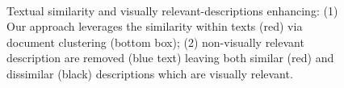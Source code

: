 \documentclass[11pt,a4paper]{article}
\newcommand\gal[1]{\textcolor{bright}{\textbf{GAL:} #1 }}
\newcommand\tzuf[1]{\textcolor{blue}{\textbf{TZUF:} #1 }}
\begin{document}
\begin{figure}[t]
\centering
{}
 \caption{Textual similarity and visually relevant-descriptions enhancing: (1) Our approach leverages the similarity within %
 texts (red) via document clustering (bottom box);
 (2) non-visually relevant description are removed (blue text) leaving both similar (red) and dissimilar (black) descriptions which are visually relevant. 
 }\ %
\label{fig:bird_example}%
\end{figure}
\end{document}
